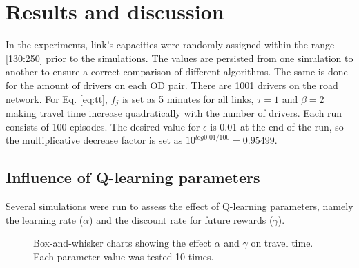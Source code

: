 \documentclass{RITA}
\newcommand{\fftt}{\ensuremath{f_j}} 		%
\begin{document}
\section{Results and discussion}
\label{sec:results}

In the experiments, link's capacities were randomly assigned within the range [130:250] prior to the simulations. The values are persisted from one simulation to another to ensure a correct comparison of different algorithms. The same is done for the amount of drivers on each OD pair. There are 1001 drivers on the road network. For Eq. \eqref{eq:tt}, $\fftt$ is set as 5 minutes for all links, $\tau = 1$ and $\beta = 2$ making travel time increase quadratically with the number of drivers. Each run consists of 100 episodes. The desired value for $\epsilon$ is 0.01 at the end of the run, so the multiplicative decrease factor is set as $10^{log 0.01 / 100} = 0.95499$.

\subsection{Influence of Q-learning parameters}

Several simulations were run to assess the effect of Q-learning parameters, namely the learning rate ($\alpha$) and the discount rate for future rewards ($\gamma$).

\begin{figure}[ht]
  \centering
  \caption{Box-and-whisker charts showing the effect $\alpha$ and $\gamma$ on travel time. Each parameter value was tested 10 times.}
  \label{fig:qLearningParams}
\end{figure}
\end{document}
